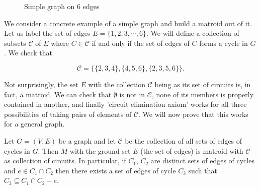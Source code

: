 \begin{figure}[H]
\centering

\caption{Simple graph on 6 edges}
  \label{simp}

\end{figure}

We consider a concrete example of a simple graph and build a matroid out of it. Let us label the set of edges $E = \{1, 2, 3, \cdots, 6\}$. We will define a collection of subsets $\mathcal{C}$ of $E$ where $C \in \mathcal{C}$ if and only if the set of edges of $C$ forms a cycle in $G$. We check that 

    $$\mathcal{C} = \{\{2,3,4\}, \{4,5,6\}, \{2, 3, 5, 6\}\}.$$

Not surprisingly, the set $E$ with the collection $\mathcal{C}$ being as its set of circuits is, in fact, a matroid. We can check that $\emptyset$ is not in $\mathcal{C}$, none of its members is properly contained in another, and finally 'circuit elimination axiom' works for all three possibilities of taking pairs of elements of $\mathcal{C}$. We will now prove that this works for a general graph.

\begin{theorem}\label{graphicproof}
Let $G = (V, E)$ be a graph and let $\mathcal{C}$ be the collection of all sets of edges of cycles in $G$. Then $M$ with the ground set $E$ (the set of edges) is matroid with $\mathcal{C}$ as collection of circuits. In particular, if $C_1$, $C_2$ are distinct sets of edges of cycles  and $e \in C_1 \cap C_2 $ then there exists a set of edges of cycle $C_3$ such that $C_3 \subseteq C_1 \cap C_2 -e$.
\end{theorem}


